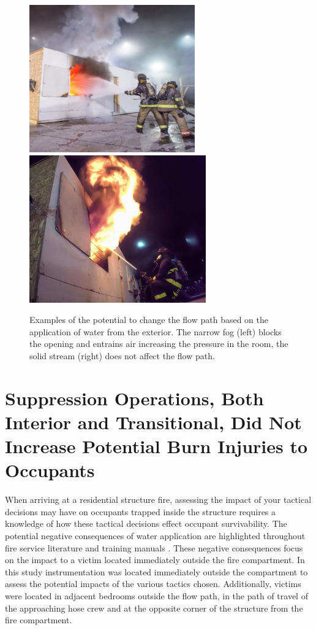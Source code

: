 \documentclass[12pt,oneside]{book}
\begin{document}
\begin{figure}[H]
\centering
\includegraphics[height=2.5in]{../0_Images/Tactical_Considerations/Flow_Path_Effect/Exterior_Fog}
\includegraphics[height=2.5in]{../0_Images/Tactical_Considerations/Flow_Path_Effect/Exterior_SS.jpg}
\caption[Exterior Application Can Change Flow path]{Examples of the potential to change the flow path based on the application of water from the exterior. The narrow fog (left) blocks the opening and entrains air increasing the pressure in the room, the solid stream (right) does not affect the flow path.}
\label{fig:flow_path_effect_TC_exerior_application}
\end{figure}

\section{Suppression Operations, Both Interior and Transitional, Did Not Increase Potential Burn Injuries to Occupants}
When arriving at a residential structure fire, assessing the impact of your tactical decisions may have on occupants trapped inside the structure requires a knowledge of how these tactical decisions effect occupant survivability. The potential negative consequences of water application are highlighted throughout fire service literature and training manuals \cite{Stowell_Essentials6}. These negative consequences focus on the impact to a victim located immediately outside the fire compartment. In this study instrumentation was located immediately outside the compartment to assess the potential impacts of the various tactics chosen. Additionally, victims were located in adjacent bedrooms outside the flow path, in the path of travel of the approaching hose crew and at the opposite corner of the structure from the fire compartment. 
\end{document}
